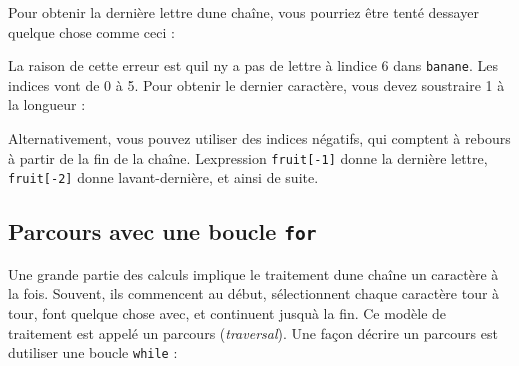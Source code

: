 Pour obtenir la dernière lettre d\textquotesingle une chaîne, vous
pourriez être tenté d\textquotesingle essayer quelque chose comme ceci :

\begin{Shaded}
\begin{Highlighting}[]
\OperatorTok{\textgreater{}\textgreater{}\textgreater{}}\OperatorTok{=} 
\OperatorTok{\textgreater{}\textgreater{}\textgreater{}}\OperatorTok{=}
\end{Highlighting}
\end{Shaded}

La raison de cette erreur est qu\textquotesingle il n\textquotesingle y
a pas de lettre à l\textquotesingle indice 6 dans
\texttt{\textquotesingle{}banane\textquotesingle{}}. Les indices vont de
0 à 5. Pour obtenir le dernier caractère, vous devez soustraire 1 à la
longueur :

\begin{Shaded}
\begin{Highlighting}[]
\OperatorTok{\textgreater{}\textgreater{}\textgreater{}}\OperatorTok{=}\NormalTok{ fruit[longueur}\OperatorTok{{-}}\NormalTok{]}
\OperatorTok{\textgreater{}\textgreater{}\textgreater{}}
\end{Highlighting}
\end{Shaded}

Alternativement, vous pouvez utiliser des indices négatifs, qui comptent
à rebours à partir de la fin de la chaîne. L\textquotesingle expression
\texttt{fruit{[}-1{]}} donne la dernière lettre, \texttt{fruit{[}-2{]}}
donne l\textquotesingle avant-dernière, et ainsi de suite.

\hypertarget{parcours-avec-une-boucle-for}{%
\subsection{\texorpdfstring{Parcours avec une boucle
\texttt{for}}{Parcours avec une boucle for}}\label{parcours-avec-une-boucle-for}}

Une grande partie des calculs implique le traitement
d\textquotesingle une chaîne un caractère à la fois. Souvent, ils
commencent au début, sélectionnent chaque caractère tour à tour, font
quelque chose avec, et continuent jusqu\textquotesingle à la fin. Ce
modèle de traitement est appelé un parcours (\emph{traversal}). Une
façon d\textquotesingle écrire un parcours est
d\textquotesingle utiliser une boucle \texttt{while} :

